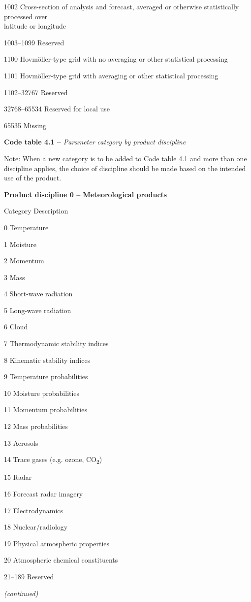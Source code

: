 1002 Cross-section of analysis and forecast, averaged or otherwise statistically processed over\\
latitude or longitude

1003--1099 Reserved

1100 Hovmöller-type grid with no averaging or other statistical processing

1101 Hovmöller-type grid with averaging or other statistical processing

1102--32767 Reserved

32768--65534 Reserved for local use

65535 Missing

\textbf{Code table 4.1 --} \emph{Parameter category by product discipline}

Note: When a new category is to be added to Code table 4.1 and more than one discipline applies, the choice of discipline should be made based on the intended use of the product.

\textbf{Product discipline 0 -- Meteorological products}

Category Description

0 Temperature

1 Moisture

2 Momentum

3 Mass

4 Short-wave radiation

5 Long-wave radiation

6 Cloud

7 Thermodynamic stability indices

8 Kinematic stability indices

9 Temperature probabilities

10 Moisture probabilities

11 Momentum probabilities

12 Mass probabilities

13 Aerosols

14 Trace gases (e.g. ozone, CO\textsubscript{2})

15 Radar

16 Forecast radar imagery

17 Electrodynamics

18 Nuclear/radiology

19 Physical atmospheric properties

20 Atmospheric chemical constituents

21--189 Reserved

\emph{(continued)}

